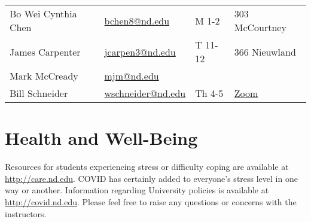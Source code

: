 \documentclass[11pt]{article}
\begin{document}
\begin{center}
\begin{tabular}{llll}
Bo Wei Cynthia Chen & \href{mailto:bchen8@nd.edu}{bchen8@nd.edu} & M 1-2 & 303 McCourtney\\
James Carpenter & \href{mailto:jcarpen3@nd.edu}{jcarpen3@nd.edu} & T 11-12 & 366 Nieuwland\\
Mark McCready & \href{mailto:mjm@nd.edu}{mjm@nd.edu} &  & \\
Bill Schneider & \href{mailto:wschneider@nd.edu}{wschneider@nd.edu} & Th 4-5 & \href{https://www.google.com/url?q=https://notredame.zoom.us/j/94668744704?pwd\%3DbXF2Q1RuSTZOamYxc2RpZUNSM1BKUT09\&sa=D\&source=calendar\&ust=1629999731737672\&usg=AOvVaw3KPyMONj9lQaVPwtRlCPVG}{Zoom}\\
\end{tabular}
\end{center}

\section{Health and Well-Being}
\label{sec:org2ddfca0}
Resources for students experiencing stress or difficulty coping are available at \url{http://care.nd.edu}. COVID has certainly added to everyone's stress level in one way or another. Information regarding University policies is available at \url{http://covid.nd.edu}.  Please feel free to raise any questions or concerns with the instructors.
\end{document}
